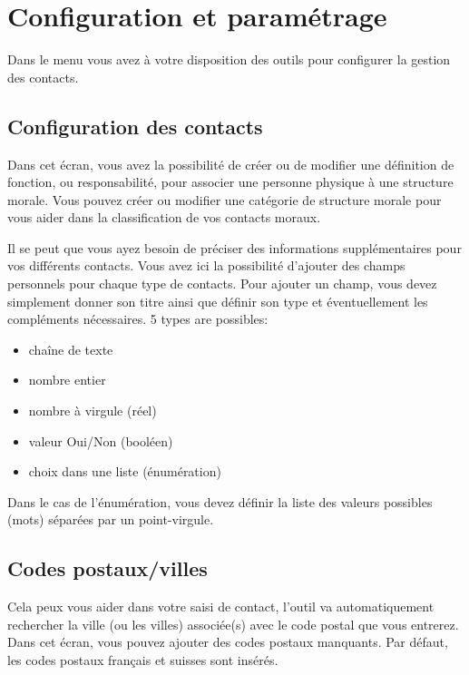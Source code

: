 \documentclass[letterpaper,10pt,french]{sphinxmanual}
\begin{document}
\noindent{}


\section{Configuration et paramétrage}
\label{\detokenize{contacts/configuration:configuration-et-parametrage}}\label{\detokenize{contacts/configuration::doc}}
Dans le menu  vous avez à votre disposition des outils pour configurer la gestion des contacts.


\subsection{Configuration des contacts}
\label{\detokenize{contacts/configuration:configuration-des-contacts}}
Dans cet écran, vous avez la possibilité de créer ou de modifier une définition de fonction, ou responsabilité, pour associer une personne physique à une structure morale. Vous pouvez créer ou modifier une catégorie de structure morale pour vous aider dans la classification de vos contacts moraux.

Il se peut que vous ayez besoin de préciser des informations supplémentaires pour vos différents contacts. Vous avez ici la possibilité d’ajouter des champs personnels pour chaque type de contacts. Pour ajouter un champ, vous devez simplement donner son titre ainsi que définir son type et éventuellement les compléments nécessaires.
5 types are possibles:
\begin{itemize}
\item {} 
chaîne de texte

\item {} 
nombre entier

\item {} 
nombre à virgule (réel)

\item {} 
valeur Oui/Non (booléen)

\item {} 
choix dans une liste (énumération)

\end{itemize}

Dans le cas de l’énumération, vous devez définir la liste des valeurs possibles (mots) séparées par un point-virgule.


\subsection{Codes postaux/villes}
\label{\detokenize{contacts/configuration:codes-postaux-villes}}
Cela peux vous aider dans votre saisi de contact, l’outil va automatiquement rechercher la ville (ou les villes) associée(s) avec le code postal que vous entrerez.
Dans cet écran, vous pouvez ajouter des codes postaux manquants.
Par défaut, les codes postaux français et suisses sont insérés.
\end{document}
